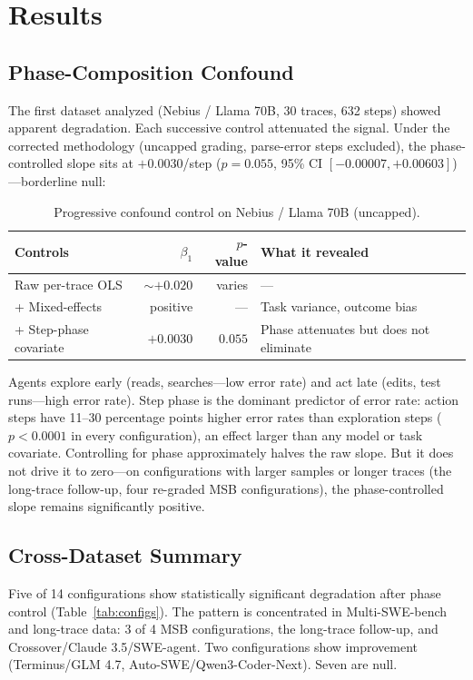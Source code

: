 \documentclass[11pt]{article}
\begin{document}
\section{Results}

\subsection{Phase-Composition Confound}

The first dataset analyzed (Nebius / Llama 70B, 30 traces, 632 steps) showed apparent degradation.
Each successive control attenuated the signal.
Under the corrected methodology (uncapped grading, parse-error steps excluded), the phase-controlled slope sits at $+0.0030$/step ($p = 0.055$, 95\% CI $[-0.00007, +0.00603]$)---borderline null:

\begin{table}[h]
\centering
\caption{Progressive confound control on Nebius / Llama 70B (uncapped).}
\label{tab:dismantling}
\begin{tabular}{lrrl}
\toprule
Controls & $\beta_1$ & $p$-value & What it revealed \\
\midrule
Raw per-trace OLS & ${\sim}+0.020$ & varies & --- \\
+ Mixed-effects & positive & --- & Task variance, outcome bias \\
+ Step-phase covariate & $+0.0030$ & $0.055$ & Phase attenuates but does not eliminate \\
\bottomrule
\end{tabular}
\end{table}

Agents explore early (reads, searches---low error rate) and act late (edits, test runs---high error rate).
Step phase is the dominant predictor of error rate: action steps have 11--30 percentage points higher error rates than exploration steps ($p < 0.0001$ in every configuration), an effect larger than any model or task covariate.
Controlling for phase approximately halves the raw slope.
But it does not drive it to zero---on configurations with larger samples or longer traces (the long-trace follow-up, four re-graded MSB configurations), the phase-controlled slope remains significantly positive.

\subsection{Cross-Dataset Summary}

Five of 14 configurations show statistically significant degradation after phase control (Table~\ref{tab:configs}).
The pattern is concentrated in Multi-SWE-bench and long-trace data: 3 of 4 MSB configurations, the long-trace follow-up, and Crossover/Claude 3.5/SWE-agent.
Two configurations show improvement (Terminus/GLM 4.7, Auto-SWE/Qwen3-Coder-Next).
Seven are null.
\end{document}
